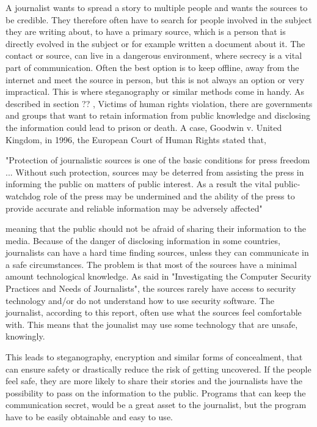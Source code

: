A journalist wants to spread a story to multiple people and wants the sources to be credible. They therefore often have to search for people involved in the subject they are writing about, to have a primary source, which is a person that is directly evolved in the subject or for example written a document about it. The contact or source, can live in a dangerous environment, where secrecy is a vital part of communication. Often the best option is to keep offline, away from the internet and meet the source in person, but this is not always an option or very impractical.\cite{secret} This is where steganography or similar methods come in handy. As described in section ?? , Victims of human rights violation, there are governments and groups that want to retain information from public knowledge and disclosing the information could lead to prison or death. A case, Goodwin v. United Kingdom, in 1996, the European Court of Human Rights stated that, 

"Protection of journalistic sources is one of the basic conditions for press freedom ... Without such protection, sources may be deterred from assisting the press in informing the public on matters of public interest. As a result the vital public-watchdog role of the press may be undermined and the ability of the press to provide accurate and reliable information may be adversely affected"\cite{case}

meaning that the public should not be afraid of sharing their information to the media. Because of the danger of disclosing information in some countries, journalists can have a hard time finding sources, unless they can communicate in a safe circumstances. The problem is that most of the sources have a minimal amount technological knowledge. As said in "Investigating the Computer Security Practices and Needs of Journalists", the sources rarely have access to security technology and/or do not understand how to use security software. The journalist, according to this report, often use what the sources feel comfortable with. This means that the jounalist may use some technology that are unsafe, knowingly.\cite{journalists}

This leads to steganography, encryption and similar forms of concealment, that can ensure safety or drastically reduce the risk of getting uncovered. If the people feel safe, they are more likely to share their stories and the journalists have the possibility to pass on the information to the public. Programs that can keep the communication secret, would be a great asset to the journalist, but the program have to be easily obtainable and easy to use.